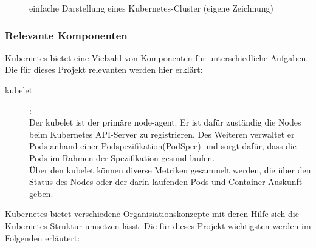 \documentclass[a4paper,10pt]{scrartcl}
\begin{document}


\begin{figure}[htbp]
  \centering
  
  \caption{einfache Darstellung eines Kubernetes-Cluster (eigene Zeichnung)}
\end{figure}

\pagebreak

\subsubsection{Relevante Komponenten}

Kubernetes bietet eine Vielzahl von Komponenten für unterschiedliche Aufgaben. Die für dieses Projekt relevanten werden hier erklärt:

\begin{description}

\item[kubelet]:\\
Der kubelet ist der primäre \glqq node-agent\grqq. Er ist dafür zuständig die Nodes beim Kubernetes API-Server zu registrieren. Des Weiteren verwaltet er Pods anhand einer Podspezifikation(PodSpec) und sorgt dafür, dass die Pods im Rahmen der Spezifikation \glqq gesund\grqq{} laufen.\\
Über den kubelet können diverse Metriken gesammelt werden, die über den Status des Nodes oder der darin laufenden Pods und Container Auskunft geben.\\

\end{description}

Kubernetes bietet verschiedene Organisiationskonzepte mit deren Hilfe sich die Kubernetes-Struktur umsetzen lässt. Die für dieses Projekt wichtigsten werden im Folgenden erläutert:
\end{document}
